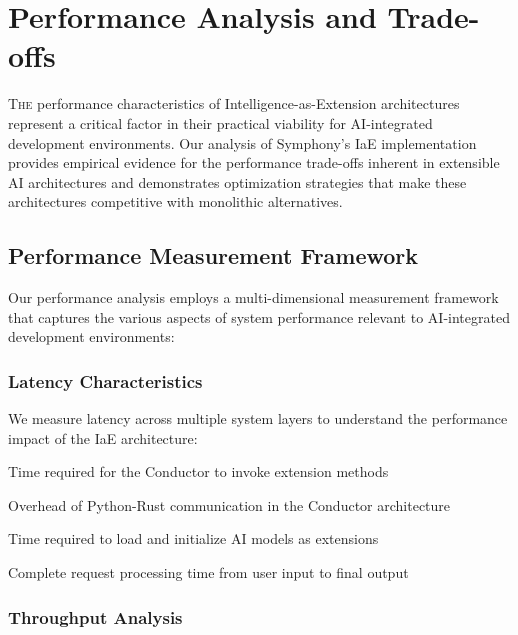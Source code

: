 
\section{Performance Analysis and Trade-offs}
\label{sec:performance-analysis}

\vspace{0.5cm}
\lettrine{T}{he} performance characteristics of Intelligence-as-Extension architectures represent a critical factor in their practical viability for AI-integrated development environments. Our analysis of Symphony's IaE implementation provides empirical evidence for the performance trade-offs inherent in extensible AI architectures and demonstrates optimization strategies that make these architectures competitive with monolithic alternatives.

\subsection{Performance Measurement Framework}

Our performance analysis employs a multi-dimensional measurement framework that captures the various aspects of system performance relevant to AI-integrated development environments:

\subsubsection{Latency Characteristics}

We measure latency across multiple system layers to understand the performance impact of the IaE architecture:

\begin{description}[leftmargin=4cm,labelwidth=3.5cm]
    \item[\textbf{Extension Call Latency}] Time required for the Conductor to invoke extension methods
    \item[\textbf{Cross-Language Latency}] Overhead of Python-Rust communication in the Conductor architecture
    \item[\textbf{Model Loading Latency}] Time required to load and initialize AI models as extensions
    \item[\textbf{End-to-End Latency}] Complete request processing time from user input to final output
\end{description}

\subsubsection{Throughput Analysis}

